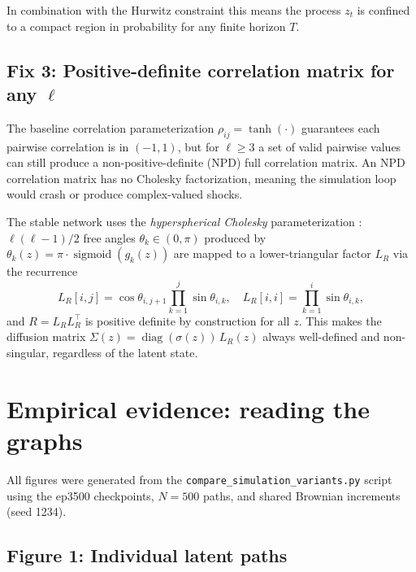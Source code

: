In combination with the Hurwitz constraint this means the process
$z_t$ is confined to a compact region in probability for any finite horizon $T$.

\subsection{Fix 3: Positive-definite correlation matrix for any $\ell$}
\label{subsec:fix_pd}

The baseline correlation parameterization $\rho_{ij} = \tanh(\cdot)$ guarantees
each pairwise correlation is in $(-1, 1)$, but for $\ell \geq 3$ a set of valid
pairwise values can still produce a non-positive-definite (NPD) full correlation
matrix.
An NPD correlation matrix has no Cholesky factorization, meaning the simulation
loop would crash or produce complex-valued shocks.

The stable network uses the \emph{hyperspherical Cholesky} parameterization
\citep{Pinheiro1996}: $\ell(\ell-1)/2$ free angles $\theta_k \in (0, \pi)$ produced
by $\theta_k(z) = \pi \cdot \operatorname{sigmoid}(g_k(z))$ are mapped to a
lower-triangular factor $L_R$ via the recurrence
\[
    L_R[i,j] = \cos\theta_{i,j+1}\prod_{k=1}^{j}\sin\theta_{i,k}, \quad
    L_R[i,i] = \prod_{k=1}^{i}\sin\theta_{i,k},
\]
and $R = L_R L_R^\top$ is positive definite by construction for all $z$.
This makes the diffusion matrix $\Sigma(z) = \operatorname{diag}(\sigma(z))\,L_R(z)$
always well-defined and non-singular, regardless of the latent state.


\section{Empirical evidence: reading the graphs}
\label{sec:sim_evidence}

All figures were generated from the \texttt{compare\_simulation\_variants.py}
script using the ep3500 checkpoints, $N = 500$ paths, and shared Brownian
increments (seed 1234).

\subsection{Figure 1: Individual latent paths}
\label{subsec:fig1}

